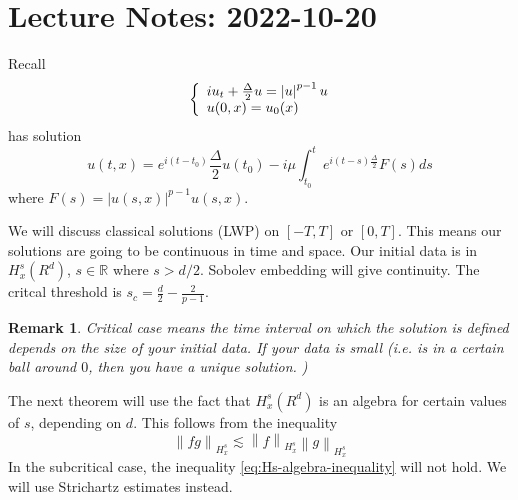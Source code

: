 \documentclass{article}
\newtheorem{remark}{Remark}
\def\R{\mathbb{R}} %
\newcommand\norm[1]{\left\lVert#1\right\rVert}
\begin{document}
\section{Lecture Notes: 2022-10-20}
Recall
\begin{equation}\label{eq:nonlinear-schrodinger-equation}
  \left\{
    \begin{array}{l@{}l}
      iu_{t} +\frac{\Delta}{2}u=\left| u \right|^{p-1}u\\
      u(0,x) = u_{0}(x)
    \end{array}
  \right.
\end{equation}
has solution
\begin{equation*}
  u(t,x)= e^{i(t-t_{0})}\frac{\Delta}{2}u(t_{0}) - i\mu \int_{t_{0}}^{t}e^{i(t-s)\frac{\Delta}{2}}F(s)ds 
\end{equation*}
where $F(s) = |u(s,x)|^{p-1}u(s,x)$.

We will discuss classical solutions (LWP) on $[-T,T]$ or $[0,T]$. This means our
solutions are going to be continuous in time and space. Our initial data is in
$H_{x}^{s}(R^{d})$, $s\in\R$ where $s>d/2$. Sobolev embedding will give
continuity. The critcal threshold is $s_{c}=\frac{d}{2}-\frac{2}{p-1}$.


\begin{remark}
  Critical case means the time interval on which the solution is defined depends
  on the size of your initial data. If your data is small (i.e. is in a certain
  ball around $0$, then you have a unique solution. )
\end{remark}

The next theorem will use the fact that $H_{x}^{s}(R^{d})$ is an algebra for
certain values of $s$, depending on $d$.  This follows from the inequality
\begin{equation}\label{eq:Hs-algebra-inequality}
  \norm{fg}_{H^{s}_{x}} 
  \lesssim \norm{f}_{H^{s}_{x}}\norm{g}_{H_{x}^{s}}
\end{equation}
In the subcritical case, the inequality \cref{eq:Hs-algebra-inequality} will not
hold. We will use Strichartz estimates instead.
\end{document}
